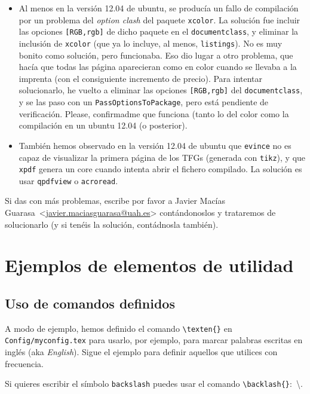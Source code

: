 \documentclass[spanish,openright]{book}
\makeatletter
\newcommand{\myAuthorName}{Javier}
\newcommand{\myAuthorSurname}{Macías Guarasa}
\newcommand{\myAuthorFullName}{\myAuthorName{} \myAuthorSurname{}}
\newcommand{\myAuthorEmail}{javier.maciasguarasa@uah.es}
\DeclareRobustCommand{\texten}[1]{\textit{#1}}
\newcommand{\contactauthor}{\myAuthorFullName~\textless\href{mailto:\myAuthorEmail}{\myAuthorEmail}\textgreater}
\makeatother
\begin{document}
\begin{itemize}

\item Al menos en la versión 12.04 de ubuntu, se producía un fallo de
compilación por un problema del \textit{option clash} del paquete
\texttt{xcolor}. La solución fue incluir las opciones
\texttt{[RGB,rgb]} de dicho paquete en el \texttt{documentclass}, y
eliminar la inclusión de \texttt{xcolor} (que ya lo incluye, al menos,
\texttt{listings}). No es muy bonito como solución, pero
funcionaba. Eso dio lugar a otro problema, que hacía que todas las
página aparecieran como en color cuando se llevaba a la imprenta (con
el consiguiente incremento de precio). Para intentar solucionarlo, he
vuelto a eliminar las opciones \texttt{[RGB,rgb]} del
\texttt{documentclass}, y se las paso con un
\texttt{PassOptionsToPackage}, pero está pendiente de
verificación. Please, confirmadme que funciona (tanto lo del color
como la compilación en un ubuntu 12.04 (o posterior).

\item También hemos observado en la versión 12.04 de ubuntu que
\texttt{evince} no es capaz de visualizar la primera página de los
TFGs (generada con \texttt{tikz}), y que \texttt{xpdf} genera un core
cuando intenta abrir el fichero compilado. La solución es usar
\texttt{qpdfview} o \texttt{acroread}.

\end{itemize}

Si das con más problemas, escribe por favor a \contactauthor
contándonoslos y trataremos de solucionarlo (y si tenéis la solución,
contádnosla también).


\section{Ejemplos de elementos de utilidad}
\label{sec:ejempl-de-elem}

\subsection{Uso de comandos definidos}
\label{sec:uso-de-comandos}

A modo de ejemplo, hemos definido el comando
\texttt{\textbackslash{}texten\{\}} en \texttt{Config/myconfig.tex} para
usarlo, por ejemplo, para marcar palabras escritas en inglés (aka
\texten{English}). Sigue el ejemplo para definir aquellos que utilices
con frecuencia.

Si quieres escribir el símbolo \texttt{backslash} puedes usar el comando
\texttt{\textbackslash{}backlash\{\}}:~\textbackslash{}.
\end{document}
